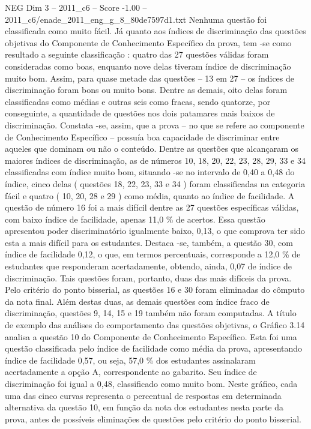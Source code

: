 \begin{textsample}{NEG Dim 3 – 2011\_c6 – Score -1.00 – 2011\_c6/enade\_2011\_eng\_g\_8\_80de7597d1.txt}
Nenhuma questão foi classificada como muito fácil.
Já quanto aos índices de discriminação das questões objetivas do Componente de Conhecimento Específico da prova, tem -se como resultado a seguinte classificação : quatro das 27 questões válidas foram consideradas como boas, enquanto nove delas tiveram índice de discriminação muito bom.
Assim, para quase metade das questões – 13 em 27 – os índices de discriminação foram bons ou muito bons.
Dentre as demais, oito delas foram classificadas como médias e outras seis como fracas, sendo quatorze, por conseguinte, a quantidade de questões nos dois patamares mais baixos de discriminação.
Constata -se, assim, que a prova – no que se refere ao componente de Conhecimento Específico – possuía boa capacidade de discriminar entre aqueles que dominam ou não o conteúdo.
Dentre as questões que alcançaram os maiores índices de discriminação, as de números 10, 18, 20, 22, 23, 28, 29, 33 e 34 classificadas com índice muito bom, situando -se no intervalo de 0,40 a 0,48 do índice, cinco delas ( questões 18, 22, 23, 33 e 34 ) foram classificadas na categoria fácil e quatro ( 10, 20, 28 e 29 ) como média, quanto ao índice de facilidade.
A questão de número 16 foi a mais difícil dentre as 27 questões específicas válidas, com baixo índice de facilidade, apenas 11,0 \% de acertos.
Essa questão apresentou poder discriminatório igualmente baixo, 0,13, o que comprova ter sido esta a mais difícil para os estudantes.
Destaca -se, também, a questão 30, com índice de facilidade 0,12, o que, em termos percentuais, corresponde a 12,0 \% de estudantes que responderam acertadamente, obtendo, ainda, 0,07 de índice de discriminação.
Tais questões foram, portanto, duas das mais difíceis da prova.
Pelo critério do ponto bisserial, as questões 16 e 30 foram eliminadas do cômputo da nota final.
Além destas duas, as demais questões com índice fraco de discriminação, questões 9, 14, 15 e 19 também não foram computadas.
A título de exemplo das análises do comportamento das questões objetivas, o Gráfico 3.14 analisa a questão 10 do Componente de Conhecimento Específico.
Esta foi uma questão classificada pelo índice de facilidade como média da prova, apresentando índice de facilidade 0,57, ou seja, 57,0 \% dos estudantes assinalaram acertadamente a opção A, correspondente ao gabarito.
Seu índice de discriminação foi igual a 0,48, classificado como muito bom.
Neste gráfico, cada uma das cinco curvas representa o percentual de respostas em determinada alternativa da questão 10, em função da nota dos estudantes nesta parte da prova, antes de possíveis eliminações de questões pelo critério do ponto bisserial.

\end{textsample}
